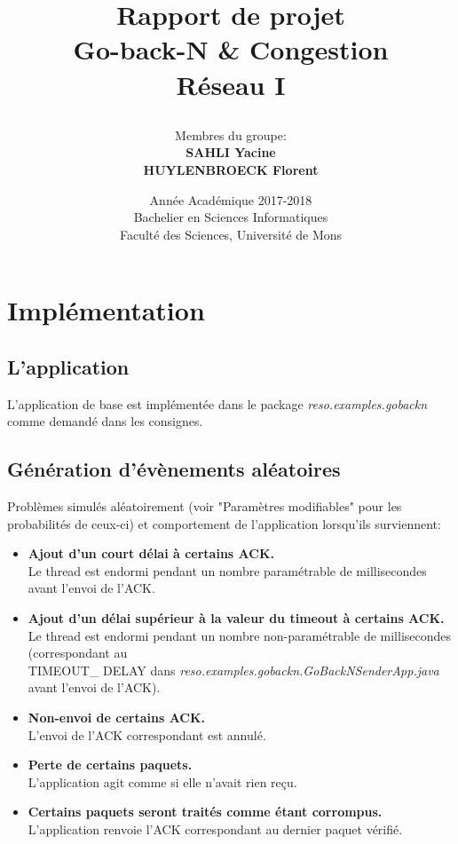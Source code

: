 \documentclass[]{article}
\begin{document}
\title{
{Rapport de projet}\\
\smallskip
{\Huge Go-back-N \& Congestion}\\
Réseau I\\
\author{Membres du groupe:\\
\textbf{SAHLI Yacine}\\
\textbf{HUYLENBROECK Florent}\\
}}

\date{Année Académique 2017-2018\\
Bachelier en Sciences Informatiques\\
\vspace{1cm}
Faculté des Sciences, Université de Mons}

\maketitle
\newpage
\section{Implémentation}
\subsection{L'application}
L'application de base est implémentée dans le package \emph{reso.examples.gobackn} comme demandé dans les consignes.
\subsection{Génération d'évènements aléatoires}
Problèmes simulés aléatoirement (voir "Paramètres modifiables" pour les probabilités de ceux-ci) et comportement de l'application lorsqu'ils surviennent:
\begin{itemize}
\item \textbf{Ajout d'un court délai à certains ACK.}\\
Le thread est endormi pendant un nombre paramétrable de millisecondes avant l'envoi de l'ACK.
\item \textbf{Ajout d'un délai supérieur à la valeur du timeout à certains ACK.}\\
Le thread est endormi pendant un nombre non-paramétrable de millisecondes (correspondant au\\ TIMEOUT\_ DELAY dans \emph{reso.examples.gobackn.GoBackNSenderApp.java} avant l'envoi de l'ACK).
\item \textbf{Non-envoi de certains ACK.}\\
L'envoi de l'ACK correspondant est annulé.
\item \textbf{Perte de certains paquets.}\\
L'application agit comme si elle n'avait rien reçu.
\item \textbf{Certains paquets seront traités comme étant corrompus.}\\
L'application renvoie l'ACK correspondant au dernier paquet vérifié.
\end{itemize}
\end{document}
